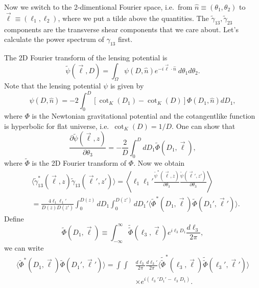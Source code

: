 Now we switch to the 2-dimentional Fourier space, i.e.~from $\hat{n}\equiv(\theta_1,\theta_2)$ to $\vec{\ell}\equiv(\ell_1,\ell_2)$, where we put a tilde above the quantities. The $\tilde{\gamma}_{13},\tilde{\gamma}_{23}$ components are the transverse shear components that we care about. Let's calculate the power spectrum of $\gamma_{13}$ first.

The 2D Fourier transform of the lensing potential is
\begin{equation}
\tilde{\psi}(\vec{\ell},D)=\int_\Omega\psi(D,\hat{n})e^{-i\vec{\ell}\cdot\hat{n}}\ d\theta_1 d\theta_2.
\label{potentialFourier}
\end{equation}
Note that the lensing potential $\psi$ is given by
\begin{equation}
\psi(D,\hat{n})=
-2\int_0^{D}[\cot_K(D_1)-\cot_K(D)]\Phi(D_1,\hat{n})dD_1,
\label{lensingpotential}
\end{equation}
where $\Phi$ is the Newtonian gravitational potential and the cotangentlike function is hyperbolic for flat universe, i.e.~$\cot_K(D)=1/D$. One can show that
\begin{equation}
\frac{\partial\tilde{\psi}(\vec{\ell},z)}{\partial\theta_3}=-\frac{2}{D}\int_0^D dD_1\tilde{\Phi}(D_1,\vec{\ell}),
\end{equation}
where $\tilde{\Phi}$ is the 2D Fourier transform of $\Phi$. Now we obtain
\begin{align}
&\langle\tilde{\gamma}_{13}^*(\vec{\ell},z)\tilde{\gamma}_{13}(\vec{\ell}',z')\rangle=\left\langle \ell_1\ell_1'\frac{\tilde{\psi}^*(\vec{\ell},z)}{\partial\theta_3}\frac{\tilde{\psi}(\vec{\ell}',z')}{\partial\theta_3}\right\rangle\nonumber\\
&=\frac{4\ell_1\ell_1'}{D(z)D(z')}\int_0^{D(z)}dD_1\int_0^{D(z')}dD_1'\langle\tilde{\Phi}^*(D_1,\vec{\ell})\tilde{\Phi}(D_1',\vec{\ell}')\rangle.
\end{align}
Define
\begin{equation}
\tilde{\Phi}(D_1,\vec{\ell})\equiv\int_{-\infty}^{\infty}\tilde{\tilde{\Phi}}(\ell_3,\vec{\ell})e^{i\ell_3D_1}\frac{d\ell_3}{2\pi},
\end{equation}
we can write
\begin{align}
\langle\tilde{\Phi}^*(D_1,\vec{\ell})\tilde{\Phi}(D_1',\vec{\ell}')\rangle=\int\int&\frac{d\ell_3}{2\pi}\frac{d\ell_3'}{2\pi}\langle\tilde{\tilde{\Phi}}^*(\ell_3,\vec{\ell})\tilde{\tilde{\Phi}}(\ell_3',\vec{\ell}')\rangle\nonumber\\
&\times e^{i(\ell_3'D_1'-\ell_3D_1)}. \label{eq:doubletilde}
\end{align}
